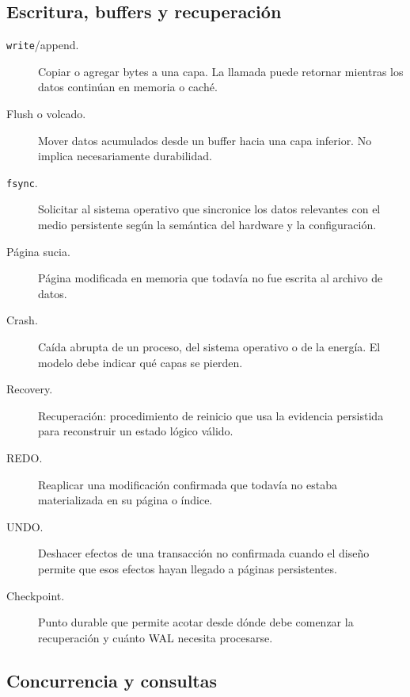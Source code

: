 \documentclass[variant=apuntes,cover=institutional,mode=screen]{ua-engineering-v6-article}
\begin{document}
\subsection{Escritura, buffers y recuperación}

\begin{description}
\item[\texttt{write}/append.] Copiar o agregar bytes a una capa. La llamada puede retornar mientras los datos continúan en memoria o caché.
\item[Flush o volcado.] Mover datos acumulados desde un buffer hacia una capa inferior. No implica necesariamente durabilidad.
\item[\texttt{fsync}.] Solicitar al sistema operativo que sincronice los datos relevantes con el medio persistente según la semántica del hardware y la configuración.
\item[Página sucia.] Página modificada en memoria que todavía no fue escrita al archivo de datos.
\item[Crash.] Caída abrupta de un proceso, del sistema operativo o de la energía. El modelo debe indicar qué capas se pierden.
\item[Recovery.] Recuperación: procedimiento de reinicio que usa la evidencia persistida para reconstruir un estado lógico válido.
\item[REDO.] Reaplicar una modificación confirmada que todavía no estaba materializada en su página o índice.
\item[UNDO.] Deshacer efectos de una transacción no confirmada cuando el diseño permite que esos efectos hayan llegado a páginas persistentes.
\item[Checkpoint.] Punto durable que permite acotar desde dónde debe comenzar la recuperación y cuánto WAL necesita procesarse.
\end{description}

\subsection{Concurrencia y consultas}
\end{document}
